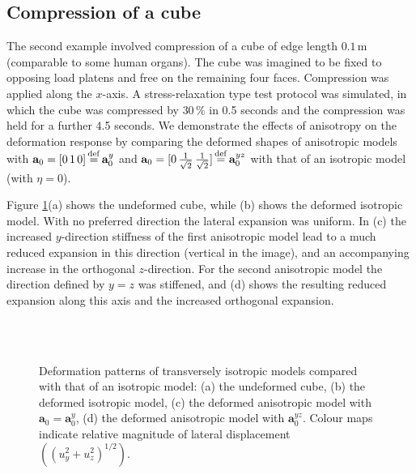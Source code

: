	\subsection{Compression of a cube}
The second example involved compression of a cube of edge length $0.1\,$m (comparable to some human organs). The cube was imagined to be fixed to opposing load platens and free on the remaining four faces. Compression was applied along the $x$-axis. A stress-relaxation type test protocol was simulated, in which the cube was compressed by $30\, \%$ in 0.5 seconds and the compression was held for a further 4.5 seconds. We demonstrate the effects of anisotropy on the deformation response by comparing the deformed shapes of anisotropic models with $\mathbf{a}_0 = [0\, 1\, 0] \, {\buildrel\rm	def\over=} \, \mathbf{a}_0^y $ and $\mathbf{a}_0 = [0\, \frac{1}{\sqrt{2}} \, \frac{1}{\sqrt{2}}] \, {\buildrel\rm	def\over=} \, \mathbf{a}_0^{yz} $  with that of an isotropic model (with $\eta = 0$).

\bigskip

Figure \ref{chap6:fig-cubeAnisotropic}(a) shows the undeformed cube, while (b) shows the deformed isotropic model. With no preferred direction the lateral expansion was uniform. In (c) the increased $y$-direction stiffness of the first anisotropic model lead to a much reduced expansion in this direction (vertical in the image), and an accompanying increase in the orthogonal $z$-direction. For the second anisotropic model the direction defined by $y = z$ was stiffened, and (d) shows the resulting reduced expansion along this axis and the increased orthogonal expansion. 
%
\begin{figure}[h]
\centering 
{}
\hspace{1cm}
 \\
\hspace{1cm}
 \\
\caption[Deformation patterns of transversely isotropic models compared with that of an isotropic model]{Deformation patterns of transversely isotropic models compared with that of an isotropic model: (a) the undeformed cube, (b) the deformed isotropic model, (c) the deformed anisotropic model with $ \mathbf{a}_0 = \mathbf{a}_0^y $, (d) the deformed anisotropic model with $\mathbf{a}_0^{yz}$. Colour maps indicate relative magnitude of lateral displacement  $((u_y^2 + u_z^2)^{1/2})$.}
\label{chap6:fig-cubeAnisotropic}
\end{figure}


